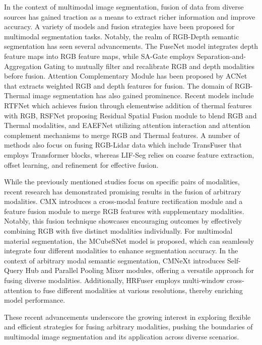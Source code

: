 \documentclass{article}
\begin{document}
In the context of multimodal image segmentation, fusion of data from diverse sources \cite{zhang2021deep} has gained traction as a means to extract richer information and improve accuracy. A variety of models and fusion strategies have been proposed for multimodal segmentation tasks. Notably, the realm of RGB-Depth semantic segmentation has seen several advancements. The FuseNet \cite{hazirbas2017fusenet} model integrates depth feature maps into RGB feature maps, while SA-Gate \cite{chen2020sa-gate} employs Separation-and-Aggregation Gating to mutually filter and recalibrate RGB and depth modalities before fusion. Attention Complementary Module has been proposed by ACNet \cite{hu2019acnet} that extracts weighted RGB and depth features for fusion. The domain of RGB-Thermal image segmentation has also gained prominence. Recent models include RTFNet \cite{sun2019rtfnet} which achieves fusion through elementwise addition of thermal features with RGB, RSFNet \cite{li2023RSFNet} proposing Residual Spatial Fusion module to blend RGB and Thermal modalities, and EAEFNet \cite{liang2023eaef} utilizing attention interaction and attention complement mechanisms to merge RGB and Thermal features. A number of methods also focus on fusing RGB-Lidar data which include TransFuser \cite{prakash2021TransFuser} that employs Transformer blocks, whereas LIF-Seg \cite{zhao2021lifseg} relies on coarse feature extraction, offset learning, and refinement for effective fusion.

While the previously mentioned studies focus on specific pairs of modalities, recent research has demonstrated promising results in the fusion of arbitrary modalities. CMX \cite{zhang2023cmx} introduces a cross-modal feature rectification module and a feature fusion module to merge RGB features with supplementary modalities. Notably, this fusion technique showcases encouraging outcomes by effectively combining RGB with five distinct modalities individually. For multimodal material segmentation, the MCubeSNet \cite{Liang2022MCubeS} model is proposed, which can seamlessly integrate four different modalities to enhance segmentation accuracy. In the context of arbitrary modal semantic segmentation, CMNeXt \cite{zhang2023CMNext} introduces Self-Query Hub and Parallel Pooling Mixer modules, offering a versatile approach for fusing diverse modalities. Additionally, HRFuser \cite{broedermann2023hrfuser} employs multi-window cross-attention to fuse different modalities at various resolutions, thereby enriching model performance.

These recent advancements underscore the growing interest in exploring flexible and efficient strategies for fusing arbitrary modalities, pushing the boundaries of multimodal image segmentation and its application across diverse scenarios.
\end{document}
